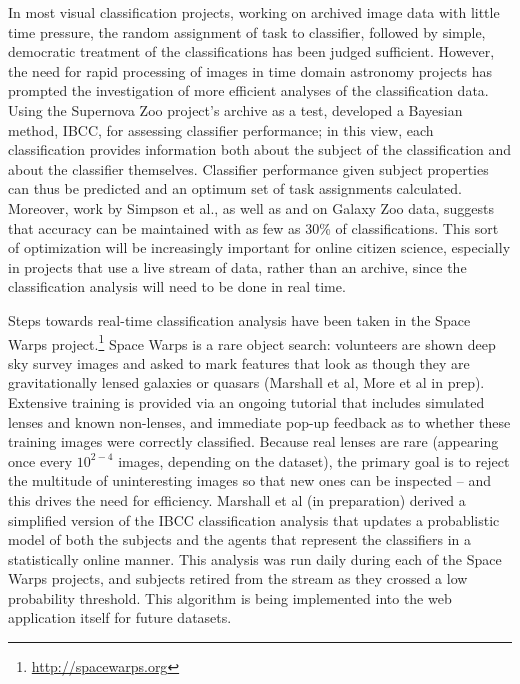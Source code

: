 \documentclass{ar2e}
\begin{document}
In most visual classification projects, working on archived image data with
little time pressure, the random assignment of task to classifier, followed by
simple, democratic treatment of the classifications has been judged sufficient.
However, the need for rapid processing of images in time domain astronomy
projects has prompted the investigation of more efficient analyses of the
classification data.  Using the Supernova Zoo project's archive as a test,
\citet{Simpson++2012IBCC} developed a Bayesian method, IBCC, for assessing
classifier performance; in this view, each classification provides information
both about the subject of the classification and about the classifier
themselves. Classifier performance given subject properties can thus be
predicted and an optimum set of task assignments calculated. 
Moreover, work by Simpson et al., as well as \citet{Kamar} and \citet{Waterhouse} on
Galaxy Zoo data, suggests that accuracy can be maintained with as few as 30\% of
classifications. 
This sort of optimization will be increasingly important for online citizen
science, especially in projects that use a live stream of data, rather than
an archive, since the classification analysis will need to be done in real time.



Steps towards real-time classification analysis have been taken in the Space
Warps project.\footnote{\url{http://spacewarps.org}} 
Space Warps is a rare object search: volunteers are shown deep
sky survey images and asked to mark features that look as though they are
gravitationally lensed galaxies or quasars (Marshall et al, More et al in prep).
Extensive training is
provided via an ongoing tutorial that includes simulated lenses and known
non-lenses, and immediate pop-up feedback as to whether these training images
were correctly classified. Because real lenses are rare (appearing once every
$10^{2-4}$ images, depending on the dataset), the primary goal is to reject the
multitude of uninteresting images so that new ones can be inspected -- and this
drives the need for efficiency. Marshall et al (in preparation) derived a
simplified version of the IBCC classification analysis that updates a
probablistic model of both the subjects and the agents that represent the
classifiers in a statistically online manner. This
analysis was run daily during each of the Space Warps projects, and subjects
retired from the stream as they crossed a low probability threshold. This
algorithm is being implemented into the web application itself for future
datasets. 
\end{document}
